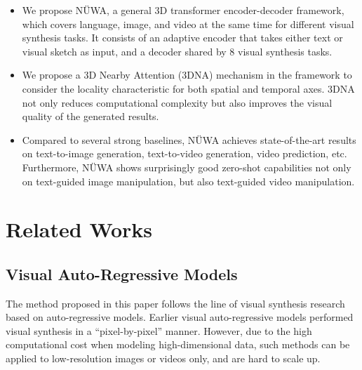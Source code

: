 \documentclass[10pt,twocolumn,letterpaper]{article}
\begin{document}
\begin{itemize}
    \item We propose NÜWA, a general 3D transformer encoder-decoder framework, which covers language, image, and video at the same time for different visual synthesis tasks. It consists of an adaptive encoder that takes either text or visual sketch as input, and a decoder shared by 8 visual synthesis tasks.
    \item We propose a 3D Nearby Attention (3DNA) mechanism in the framework to consider the locality characteristic for both spatial and temporal axes. 3DNA not only reduces computational complexity but also improves the visual quality of the generated results.
    
    \item Compared to several strong baselines, NÜWA achieves state-of-the-art results on text-to-image generation, text-to-video generation, video prediction, etc. Furthermore, NÜWA shows surprisingly good zero-shot capabilities not only on text-guided image manipulation, but also text-guided video manipulation.
    
\end{itemize}





\section{Related Works}\label{sec:rw}


\subsection{Visual Auto-Regressive Models}

The method proposed in this paper follows the line of visual synthesis research based on auto-regressive models. Earlier visual auto-regressive models \cite{oordConditionalImageGeneration2016, vanoordPixelRecurrentNeural2016, parmarImageTransformer2018, chenGenerativepretrainingPixels2020, weissenbornScalingAutoregressiveVideo2020} performed visual synthesis in a ``pixel-by-pixel'' manner.
However, due to the high computational cost when modeling high-dimensional data, such methods can be applied to low-resolution images or videos only, and are hard to scale up.
\end{document}
